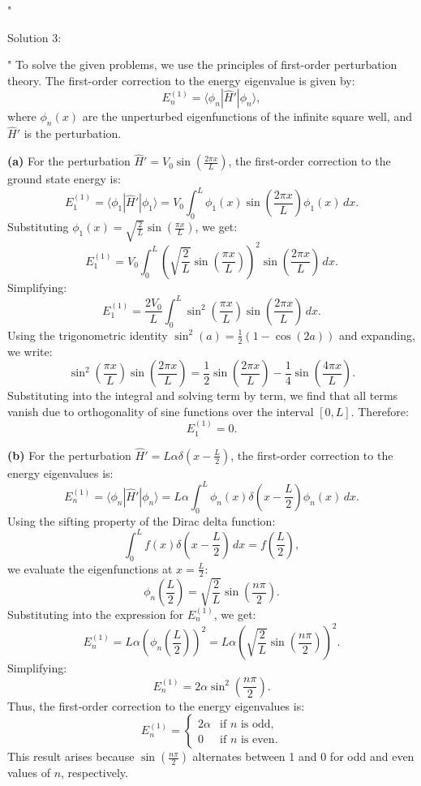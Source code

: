 "

Solution 3:

"
To solve the given problems, we use the principles of first-order perturbation theory. The first-order correction to the energy eigenvalue is given by:
\[
E_n^{(1)} = \langle \phi_n | \hat{H}' | \phi_n \rangle,
\]
where \(\phi_n(x)\) are the unperturbed eigenfunctions of the infinite square well, and \(\hat{H}'\) is the perturbation.

\textbf{(a)} For the perturbation \(\hat{H}' = V_0 \sin\left(\frac{2\pi x}{L}\right)\), the first-order correction to the ground state energy is:
\[
E_1^{(1)} = \langle \phi_1 | \hat{H}' | \phi_1 \rangle = V_0 \int_0^L \phi_1(x) \sin\left(\frac{2\pi x}{L}\right) \phi_1(x) \, dx.
\]
Substituting \(\phi_1(x) = \sqrt{\frac{2}{L}} \sin\left(\frac{\pi x}{L}\right)\), we get:
\[
E_1^{(1)} = V_0 \int_0^L \left(\sqrt{\frac{2}{L}} \sin\left(\frac{\pi x}{L}\right)\right)^2 \sin\left(\frac{2\pi x}{L}\right) \, dx.
\]
Simplifying:
\[
E_1^{(1)} = \frac{2 V_0}{L} \int_0^L \sin^2\left(\frac{\pi x}{L}\right) \sin\left(\frac{2\pi x}{L}\right) \, dx.
\]
Using the trigonometric identity \(\sin^2(a) = \frac{1}{2} (1 - \cos(2a))\) and expanding, we write:
\[
\sin^2\left(\frac{\pi x}{L}\right) \sin\left(\frac{2\pi x}{L}\right) = \frac{1}{2} \sin\left(\frac{2\pi x}{L}\right) - \frac{1}{4} \sin\left(\frac{4\pi x}{L}\right).
\]
Substituting into the integral and solving term by term, we find that all terms vanish due to orthogonality of sine functions over the interval \([0, L]\). Therefore:
\[
E_1^{(1)} = 0.
\]

\textbf{(b)} For the perturbation \(\hat{H}' = L \alpha \delta\left(x - \frac{L}{2}\right)\), the first-order correction to the energy eigenvalues is:
\[
E_n^{(1)} = \langle \phi_n | \hat{H}' | \phi_n \rangle = L \alpha \int_0^L \phi_n(x) \delta\left(x - \frac{L}{2}\right) \phi_n(x) \, dx.
\]
Using the sifting property of the Dirac delta function:
\[
\int_0^L f(x) \delta\left(x - \frac{L}{2}\right) \, dx = f\left(\frac{L}{2}\right),
\]
we evaluate the eigenfunctions at \(x = \frac{L}{2}\):
\[
\phi_n\left(\frac{L}{2}\right) = \sqrt{\frac{2}{L}} \sin\left(\frac{n \pi}{2}\right).
\]
Substituting into the expression for \(E_n^{(1)}\), we get:
\[
E_n^{(1)} = L \alpha \left(\phi_n\left(\frac{L}{2}\right)\right)^2 = L \alpha \left(\sqrt{\frac{2}{L}} \sin\left(\frac{n \pi}{2}\right)\right)^2.
\]
Simplifying:
\[
E_n^{(1)} = 2 \alpha \sin^2\left(\frac{n \pi}{2}\right).
\]
Thus, the first-order correction to the energy eigenvalues is:
\[
E_n^{(1)} = 
\begin{cases}
2 \alpha & \text{if } n \text{ is odd}, \\
0 & \text{if } n \text{ is even}.
\end{cases}
\]
This result arises because \(\sin\left(\frac{n \pi}{2}\right)\) alternates between 1 and 0 for odd and even values of \(n\), respectively.

